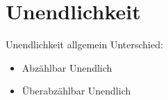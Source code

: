 
\section{Unendlichkeit}


% 






\begin{frame}[c]{Unendlichkeit allgemein}
    \Large
    Unterschied:
    \pause
    \begin{itemize}
        \item Abzählbar Unendlich 
            \pause
        \item Überabzählbar Unendlich 
    \end{itemize}
\end{frame}



